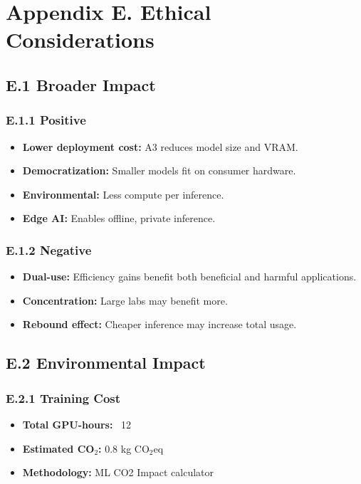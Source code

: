
\section{Appendix E. Ethical Considerations}

\subsection{E.1 Broader Impact}

\subsubsection{E.1.1 Positive}

\begin{itemize}
\item \textbf{Lower deployment cost:} A3 reduces model size and VRAM.
\item \textbf{Democratization:} Smaller models fit on consumer hardware.
\item \textbf{Environmental:} Less compute per inference.
\item \textbf{Edge AI:} Enables offline, private inference.

\end{itemize}
\subsubsection{E.1.2 Negative}

\begin{itemize}
\item \textbf{Dual-use:} Efficiency gains benefit both beneficial and harmful applications.
\item \textbf{Concentration:} Large labs may benefit more.
\item \textbf{Rebound effect:} Cheaper inference may increase total usage.

\end{itemize}
\subsection{E.2 Environmental Impact}

\subsubsection{E.2.1 Training Cost}

\begin{itemize}
\item \textbf{Total GPU-hours:} ~12
\item \textbf{Estimated CO$_2$:} 0.8 kg CO$_2$eq
\item \textbf{Methodology:} ML CO2 Impact calculator

\end{itemize}
